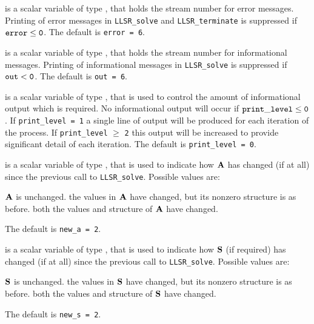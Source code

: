 \documentclass{galahad}
\newcommand{\packagename}{LLSR}
\begin{document}
\begin{description}
 is a scalar variable of type \integer, that holds the
stream number for error messages.
Printing of error messages in
{\tt \packagename\_solve} and {\tt \packagename\_terminate}
is suppressed if ${\tt error} \leq {\tt 0}$.
The default is {\tt error = 6}.

 is a scalar variable of type \integer, that holds the
stream number for informational messages.
Printing of informational messages in
{\tt \packagename\_solve} is suppressed if ${\tt out} < {\tt 0}$.
The default is {\tt out = 6}.

 is a scalar variable of type \integer,
that is used
to control the amount of informational output which is required. No
informational output will occur if ${\tt print\_level} \leq {\tt 0}$. If
{\tt print\_level = 1} a single line of output will be produced for each
iteration of the process. If {\tt print\_level} $\geq$ {\tt 2} this output
will be increased to provide significant detail of each iteration.
The default is {\tt print\_level = 0}.


 is a scalar variable of type \integer, that is used
to indicate how ${\mathbf{A}}$ has changed (if at all) since the previous
call to {\tt \packagename\_solve}. Possible values are:
\begin{description}
 ${\mathbf{A}}$ is unchanged.
 the values in ${\mathbf{A}}$ have changed, but its nonzero structure
is as before.
 both the values and structure of ${\mathbf{A}}$ have changed.
\end{description}
The default is {\tt new\_a = 2}.

 is a scalar variable of type \integer, that is used
to indicate how ${\mathbf{S}}$ (if required) has changed (if at all) since the previous
call to {\tt \packagename\_solve}. Possible values are:
\begin{description}
 ${\mathbf{S}}$ is unchanged.
 the values in ${\mathbf{S}}$ have changed, but its nonzero structure
is as before.
 both the values and structure of ${\mathbf{S}}$ have changed.
\end{description}
The default is {\tt new\_s = 2}.


\end{description}
\end{document}
